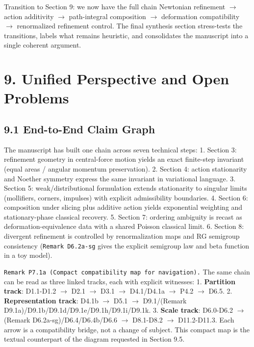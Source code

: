 \documentclass[
]{article}
\begin{document}
Transition to Section 9: we now have the full chain Newtonian refinement
\(\to\) action additivity \(\to\) path-integral composition \(\to\)
deformation compatibility \(\to\) renormalized refinement control. The
final synthesis section stress-tests the transitions, labels what
remains heuristic, and consolidates the manuscript into a single
coherent argument.

\section{9. Unified Perspective and Open
Problems}\label{unified-perspective-and-open-problems}

\subsection{9.1 End-to-End Claim Graph}\label{end-to-end-claim-graph}

The manuscript has built one chain across seven technical steps: 1.
Section 3: refinement geometry in central-force motion yields an exact
finite-step invariant (equal areas / angular momentum preservation). 2.
Section 4: action stationarity and Noether symmetry express the same
invariant in variational language. 3. Section 5: weak/distributional
formulation extends stationarity to singular limits (mollifiers,
corners, impulses) with explicit admissibility boundaries. 4. Section 6:
composition under slicing plus additive action yields exponential
weighting and stationary-phase classical recovery. 5. Section 7:
ordering ambiguity is recast as deformation-equivalence data with a
shared Poisson classical limit. 6. Section 8: divergent refinement is
controlled by renormalization maps and RG semigroup consistency
(\texttt{Remark\ D6.2a-sg} gives the explicit semigroup law and beta
function in a toy model).

\texttt{Remark\ P7.1a\ (Compact\ compatibility\ map\ for\ navigation).}
The same chain can be read as three linked tracks, each with explicit
witnesses: 1. \textbf{Partition track}: D1.1-D1.2 \(\to\) D2.1 \(\to\)
D3.1 \(\to\) D4.1/D4.1a \(\to\) P4.2 \(\to\) D6.5. 2.
\textbf{Representation track}: D4.1b \(\to\) D5.1 \(\to\) D9.1/(Remark
D9.1a)/D9.1b/D9.1d/D9.1e/D9.1h/D9.1i/D9.1k. 3. \textbf{Scale track}:
D6.0-D6.2 \(\to\) (Remark D6.2a-sg)/D6.4/D6.4b/D6.6 \(\to\) D8.1-D8.2
\(\to\) D11.2-D11.3. Each arrow is a compatibility bridge, not a change
of subject. This compact map is the textual counterpart of the diagram
requested in Section 9.5.
\end{document}
